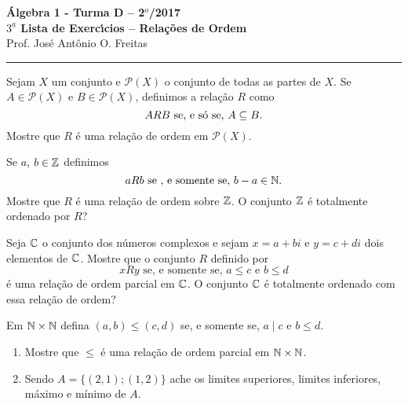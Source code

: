 \documentclass[12pt]{article}
\begin{document}


\begin{center}
{\Large\bf {\'A}lgebra 1 - Turma D -- 2$^{o}$/2017} \\ \vspace{9pt} {\large\bf
  $3^{\underline{a}}$ Lista de Exerc{\'\i}cios -- Rela\c{c}\~oes de Ordem}\\
\vspace{9pt} Prof. Jos{\'e} Ant{\^o}nio O. Freitas
\end{center}
\hrule

\vspace{.6cm}

\questao Sejam $X$ um conjunto e $\mathcal{P}(X)$ o conjunto de todas as partes de $X$. Se $A \in \mathcal{P}(X)$ e $B \in \mathcal{P}(X)$, definimos a relação $R$ como
\[
	ARB \mbox{ se, e só se, } A \subseteq B.
\]
Mostre que $R$ é uma relação de ordem em $\mathcal{P}(X)$.

\vesp

\questao Se $a$, $b \in \mathbb{Z}$ definimos
\[
	aRb \mbox{ se , e somente se, } b - a \in \mathbb{N}.
\]
Mostre que $R$ é uma relação de ordem sobre $\mathbb{Z}$. O conjunto $\mathbb{Z}$ é totalmente ordenado por $R$?

\vesp

\questao Seja $\mathbb{C}$ o conjunto dos números complexos e sejam $x = a + bi$ e $y = c + di$ dois elementos de $\mathbb{C}$.
Mostre que o conjunto $R$ definido por
\[
	xRy \mbox{ se, e somente se, } a \leqslant c \mbox{ e } b \leqslant d
\]
é uma relação de ordem parcial em $\mathbb{C}$. O conjunto $\mathbb{C}$ é totalmente ordenado com essa relação de ordem?

\vesp

\questao Em $\mathbb{N} \times \mathbb{N}$ defina $(a,b) \leqslant (c, d)$ se, e somente se, $a \mid c$ e $b \leqslant d$.
\begin{enumerate}[label={\alph*})]
	\item Mostre que $\leqslant$ é uma relação de ordem parcial em $\mathbb{N} \times \mathbb{N}$.
	\item Sendo $A = \{(2,1);(1,2)\}$ ache os limites superiores, limites inferiores, máximo e mínimo de $A$.
\end{enumerate}

\vesp
\end{document}
